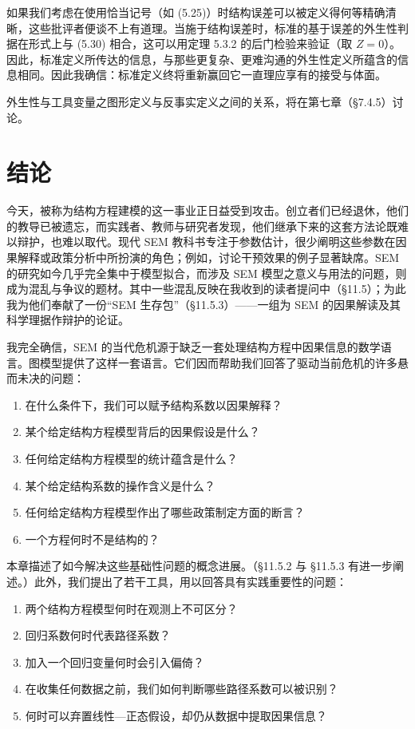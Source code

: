 如果我们考虑在使用恰当记号（如 \textup{(5.25)}）时结构误差可以被定义得何等精确清晰，这些批评者便谈不上有道理。当施于结构误差时，标准的基于误差的外生性判据在形式上与 \textup{(5.30)} 相合，这可以用定理 5.3.2 的后门检验来验证（取 $Z=0$）。因此，标准定义所传达的信息，与那些更复杂、更难沟通的外生性定义所蕴含的信息相同。因此我确信：标准定义终将重新赢回它一直理应享有的接受与体面。

外生性与工具变量之图形定义与反事实定义之间的关系，将在第七章（\S 7.4.5）讨论。

\section{结论}

今天，被称为结构方程建模的这一事业正日益受到攻击。创立者们已经退休，他们的教导已被遗忘，而实践者、教师与研究者发现，他们继承下来的这套方法论既难以辩护，也难以取代。现代 SEM 教科书专注于参数估计，很少阐明这些参数在因果解释或政策分析中所扮演的角色；例如，讨论干预效果的例子显著缺席。SEM 的研究如今几乎完全集中于模型拟合，而涉及 SEM 模型之意义与用法的问题，则成为混乱与争议的题材。其中一些混乱反映在我收到的读者提问中（\S 11.5）；为此我为他们奉献了一份“SEM 生存包”（\S 11.5.3）——一组为 SEM 的因果解读及其科学理据作辩护的论证。

我完全确信，SEM 的当代危机源于缺乏一套处理结构方程中因果信息的数学语言。图模型提供了这样一套语言。它们因而帮助我们回答了驱动当前危机的许多悬而未决的问题：

\begin{enumerate}[label=\arabic*.,leftmargin=1.8em]
\item 在什么条件下，我们可以赋予结构系数以因果解释？
\item 某个给定结构方程模型背后的因果假设是什么？
\item 任何给定结构方程模型的统计蕴含是什么？
\item 某个给定结构系数的操作含义是什么？
\item 任何给定结构方程模型作出了哪些政策制定方面的断言？
\item 一个方程何时不是结构的？
\end{enumerate}

本章描述了如今解决这些基础性问题的概念进展。（\S 11.5.2 与 \S 11.5.3 有进一步阐述。）此外，我们提出了若干工具，用以回答具有实践重要性的问题：

\begin{enumerate}[label=\arabic*.,leftmargin=1.8em]
\item 两个结构方程模型何时在观测上不可区分？
\item 回归系数何时代表路径系数？
\item 加入一个回归变量何时会引入偏倚？
\item 在收集任何数据之前，我们如何判断哪些路径系数可以被识别？
\item 何时可以弃置线性—正态假设，却仍从数据中提取因果信息？
\end{enumerate}

